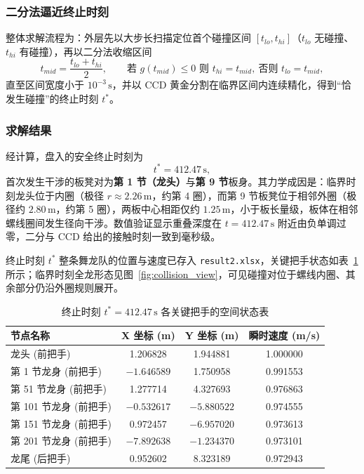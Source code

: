 ﻿\documentclass{cumcmthesis}
\begin{document}
\subsubsection{二分法逼近终止时刻}
整体求解流程为：外层先以大步长扫描定位首个碰撞区间 $[t_{lo},t_{hi}]$（$t_{lo}$ 无碰撞、$t_{hi}$ 有碰撞），再以二分法收缩区间
\begin{equation}
t_{mid}=\frac{t_{lo}+t_{hi}}{2},\qquad
\text{若 } g(t_{mid})\le 0 \text{ 则 } t_{hi}=t_{mid},\ \text{否则 } t_{lo}=t_{mid},
\end{equation}
直至区间宽度小于 $10^{-3}\,\text{s}$，并以 CCD 黄金分割在临界区间内连续精化，得到“恰发生碰撞”的终止时刻 $t^{*}$。

\subsubsection{求解结果}
经计算，盘入的安全终止时刻为
\begin{equation}
t^{*} = 412.47\,\text{s},
\end{equation}
首次发生干涉的板凳对为\textbf{第 1 节（龙头）}与\textbf{第 9 节}板身。其力学成因是：临界时刻龙头位于内圈（极径 $r\approx 2.26\,\text{m}$，约第 4 圈），而第 9 节板凳位于相邻外圈（极径约 $2.80\,\text{m}$，约第 5 圈），两板中心相距仅约 $1.25\,\text{m}$，小于板长量级，板体在相邻螺线圈间发生径向干涉。数值验证显示重叠深度在 $t=412.47\,\text{s}$ 附近由负单调过零，二分与 CCD 给出的接触时刻一致到毫秒级。

终止时刻 $t^{*}$ 整条舞龙队的位置与速度已存入 \texttt{result2.xlsx}，关键把手状态如表~\ref{tab:tstar} 所示；临界时刻全龙形态见图~\ref{fig:collision_view}，可见碰撞对位于螺线内圈、其余部分仍沿外圈规则展开。

\begin{table}[H]
    \centering
    \caption{终止时刻 $t^* = 412.47\,\text{s}$ 各关键把手的空间状态表}
    \label{tab:tstar}
    \begin{tabular}{lccc}
        \toprule
        节点名称 & X 坐标 (m) & Y 坐标 (m) & 瞬时速度 (m/s) \\
        \midrule
        龙头 (前把手) & 1.206828 & 1.944881 & 1.000000 \\
        第 1 节龙身 (前把手) & $-1.646589$ & 1.750958 & 0.991553 \\
        第 51 节龙身 (前把手) & 1.277714 & 4.327693 & 0.976863 \\
        第 101 节龙身 (前把手) & $-0.532617$ & $-5.880522$ & 0.974555 \\
        第 151 节龙身 (前把手) & 0.972457 & $-6.957020$ & 0.973613 \\
        第 201 节龙身 (前把手) & $-7.892638$ & $-1.234370$ & 0.973101 \\
        龙尾 (后把手) & 0.952602 & 8.323189 & 0.972943 \\
        \bottomrule
    \end{tabular}
\end{table}
\end{document}
